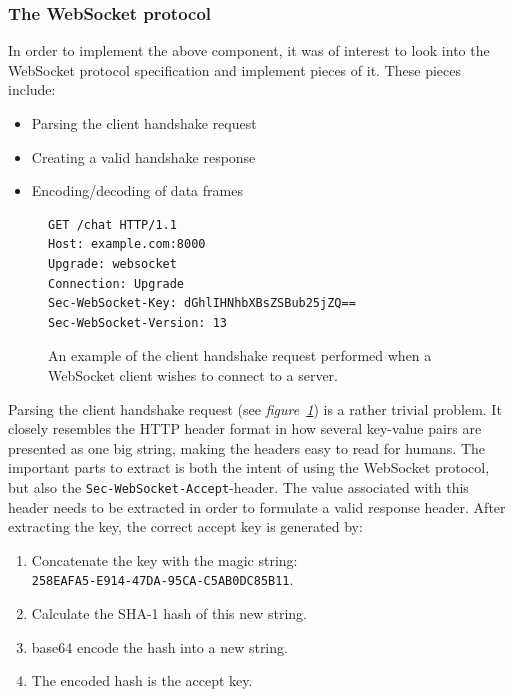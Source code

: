 \subsubsection{The WebSocket protocol}

In order to implement the above component, it was of interest to look into the WebSocket protocol specification and implement pieces of it. These pieces include:

\begin{itemize}
	\item Parsing the client handshake request
	\item Creating a valid handshake response
	\item Encoding/decoding of data frames
\end{itemize}

\begin{figure}[H]
	\begin{center}
		\begin{lstlisting}
GET /chat HTTP/1.1
Host: example.com:8000
Upgrade: websocket
Connection: Upgrade
Sec-WebSocket-Key: dGhlIHNhbXBsZSBub25jZQ==
Sec-WebSocket-Version: 13
		\end{lstlisting}
		\caption{An example of the client handshake request performed when a WebSocket client wishes to connect to a server\cite{ws-howto}.}
		\label{handshake-request}
	\end{center}
\end{figure}

Parsing the client handshake request (see \textit{figure~\ref{handshake-request}}) is a rather trivial problem. It closely resembles the HTTP header format in how several key-value pairs are presented as one big string, making the headers easy to read for humans. The important parts to extract is both the intent of using the WebSocket protocol, but also the \lstinline{Sec-WebSocket-Accept}-header. The value associated with this header needs to be extracted in order to formulate a valid response header. After extracting the key, the correct accept key is generated by\cite{ws-howto}:

\begin{enumerate}
	\item Concatenate the key with the magic string: \\
		\lstinline{258EAFA5-E914-47DA-95CA-C5AB0DC85B11}.
	\item Calculate the SHA-1 hash of this new string.
	\item base64 encode the hash into a new string.
	\item The encoded hash is the accept key.
\end{enumerate}

